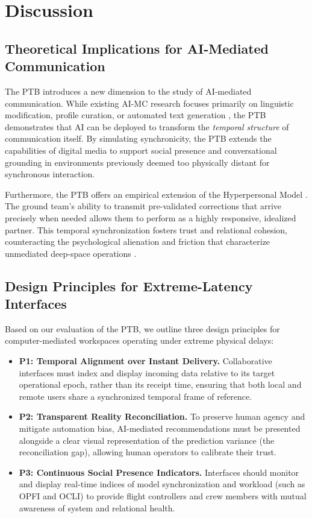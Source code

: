 \documentclass[12pt,a4paper]{article}
\begin{document}
\section{Discussion}

\subsection{Theoretical Implications for AI-Mediated Communication}
The PTB introduces a new dimension to the study of AI-mediated communication. While existing AI-MC research focuses primarily on linguistic modification, profile curation, or automated text generation \citep{hancock2020}, the PTB demonstrates that AI can be deployed to transform the \textit{temporal structure} of communication itself. By simulating synchronicity, the PTB extends the capabilities of digital media to support social presence and conversational grounding in environments previously deemed too physically distant for synchronous interaction.

Furthermore, the PTB offers an empirical extension of the Hyperpersonal Model \citep{walther1996}. The ground team's ability to transmit pre-validated corrections that arrive precisely when needed allows them to perform as a highly responsive, idealized partner. This temporal synchronization fosters trust and relational cohesion, counteracting the psychological alienation and friction that characterize unmediated deep-space operations \citep{kanas2017}.

\subsection{Design Principles for Extreme-Latency Interfaces}
Based on our evaluation of the PTB, we outline three design principles for computer-mediated workspaces operating under extreme physical delays:
\begin{itemize}
    \item \textbf{P1: Temporal Alignment over Instant Delivery.} Collaborative interfaces must index and display incoming data relative to its target operational epoch, rather than its receipt time, ensuring that both local and remote users share a synchronized temporal frame of reference.
    \item \textbf{P2: Transparent Reality Reconciliation.} To preserve human agency and mitigate automation bias, AI-mediated recommendations must be presented alongside a clear visual representation of the prediction variance (the reconciliation gap), allowing human operators to calibrate their trust.
    \item \textbf{P3: Continuous Social Presence Indicators.} Interfaces should monitor and display real-time indices of model synchronization and workload (such as OPFI and OCLI) to provide flight controllers and crew members with mutual awareness of system and relational health.
\end{itemize}
\end{document}
